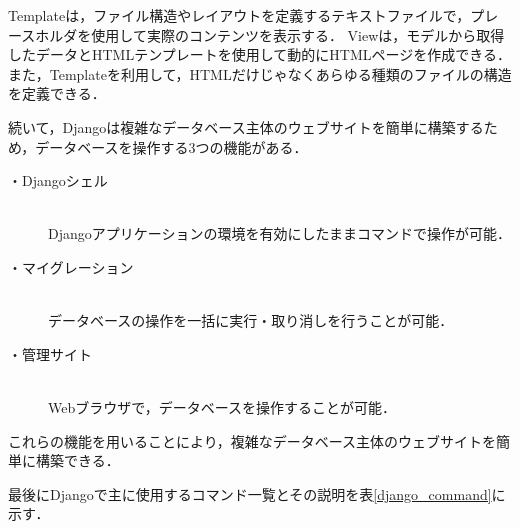 Templateは，ファイル構造やレイアウトを定義するテキストファイルで，プレースホルダを使用して実際のコンテンツを表示する．
Viewは，モデルから取得したデータとHTMLテンプレートを使用して動的にHTMLページを作成できる．
また，Templateを利用して，HTMLだけじゃなくあらゆる種類のファイルの構造を定義できる．

\newpage
続いて，Djangoは複雑なデータベース主体のウェブサイトを簡単に構築するため，データベースを操作する3つの機能がある．
\begin{description}
    \item[・Djangoシェル]\mbox{}\\
        Djangoアプリケーションの環境を有効にしたままコマンドで操作が可能．
    \item[・マイグレーション]\mbox{}\\
        データベースの操作を一括に実行・取り消しを行うことが可能．
    \item[・管理サイト]\mbox{}\\
        Webブラウザで，データベースを操作することが可能． 
\end{description}
これらの機能を用いることにより，複雑なデータベース主体のウェブサイトを簡単に構築できる．

最後にDjangoで主に使用するコマンド一覧とその説明を表\ref{django_command}に示す．

